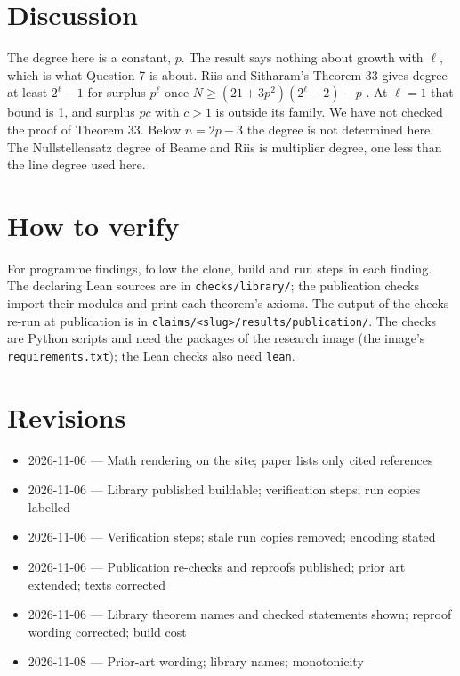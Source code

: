 \documentclass{article}
\begin{document}
\section{Discussion}

The degree here is a constant, $p$. The result says nothing about growth with $\ell$, which is
what Question 7 is about. Riis and Sitharam's Theorem 33 gives degree at least $2^\ell-1$ for
surplus $p^\ell$ once $N\ge(21+3p^2)(2^\ell-2)-p$ \cite{riis1997nonconstant}. At $\ell=1$ that bound
is 1, and surplus $pc$ with $c>1$ is outside its family. We have not checked the proof of
Theorem 33. Below $n=2p-3$ the degree is not determined here. The Nullstellensatz degree of
Beame and Riis \cite{beame1998counting} is multiplier degree, one less than the line degree used here.

\section{How to verify}

For programme findings, follow the clone, build and run steps in each finding. The declaring Lean sources are in \texttt{checks/library/}; the publication checks import their modules and print each theorem's axioms. The output of the checks re-run at publication is in \texttt{claims/<slug>/results/publication/}. The checks are Python scripts and need the packages of the research image (the image's \texttt{requirements.txt}); the Lean checks also need \texttt{lean}.

\section{Revisions}

\begin{itemize}
\item 2026-11-06 --- Math rendering on the site; paper lists only cited references
\item 2026-11-06 --- Library published buildable; verification steps; run copies labelled
\item 2026-11-06 --- Verification steps; stale run copies removed; encoding stated
\item 2026-11-06 --- Publication re-checks and reproofs published; prior art extended; texts corrected
\item 2026-11-06 --- Library theorem names and checked statements shown; reproof wording corrected; build cost
\item 2026-11-08 --- Prior-art wording; library names; monotonicity
\end{itemize}



\end{document}
